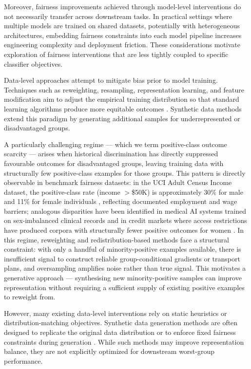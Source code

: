 Moreover, fairness improvements achieved through model-level interventions do
not necessarily transfer across downstream tasks.
In practical settings where multiple models are trained on shared datasets,
potentially with heterogeneous architectures, embedding fairness constraints
into each model pipeline increases engineering complexity and deployment
friction.
These considerations motivate exploration of fairness interventions that are
less tightly coupled to specific classifier objectives.

Data-level approaches attempt to mitigate bias prior to model training.
Techniques such as reweighting, resampling, representation learning, and
feature modification aim to adjust the empirical training distribution so that
standard learning algorithms produce more equitable outcomes
\cite{kamiran2012data}.
Synthetic data methods extend this paradigm by generating additional samples
for underrepresented or disadvantaged groups.

A particularly challenging regime — which we term positive-class outcome
scarcity — arises when historical discrimination has directly suppressed
favourable outcomes for disadvantaged groups, leaving training data with
structurally few positive-class examples for those groups.
This pattern is directly observable in benchmark fairness datasets: in the
UCI Adult Census Income dataset, the positive-class rate (income $>$\$50K)
is approximately 30\% for male and 11\% for female individuals
\cite{goldin2000orchestrating}, reflecting documented employment and wage
barriers; analogous disparities have been identified in medical AI systems
trained on sex-imbalanced clinical records \cite{cirillo2020sex} and in
credit markets where access restrictions have produced corpora with
structurally fewer positive outcomes for women \cite{bartlett2022consumer}.
In this regime, reweighting and redistribution-based methods face a
structural constraint: with only a handful of minority-positive examples
available, there is insufficient signal to construct reliable
group-conditional gradients or transport plans, and oversampling amplifies
noise rather than true signal.
This motivates a generative approach — synthesising new minority-positive
samples can improve representation without requiring a sufficient supply of
existing positive examples to reweight from.

However, many existing data-level interventions rely on static heuristics or
distribution-matching objectives.
Synthetic data generation methods are often designed to replicate the original
data distribution or to enforce fixed fairness constraints during generation
\cite{Xu2019CTGAN}.
While such methods may improve representation balance, they are not explicitly
optimized for downstream worst-group performance.

